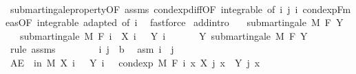 \begin{isabellebody}
%
\isadelimproof
\ \ %
\endisadelimproof
%
\isatagproof
{}\isamarkupfalse%
\ submartingale{\isacharunderscore}{\kern0pt}property{\isacharbrackleft}{\kern0pt}OF\ assms{\isacharbrackright}{\kern0pt}\ cond{\isacharunderscore}{\kern0pt}exp{\isacharunderscore}{\kern0pt}diff{\isacharbrackleft}{\kern0pt}OF\ integrable{\isacharparenleft}{\kern0pt}{}{\isacharcomma}{\kern0pt}{}{\isacharparenright}{\kern0pt}{\isacharcomma}{\kern0pt}\ of\ i\ j\ i{\isacharbrackright}{\kern0pt}\ cond{\isacharunderscore}{\kern0pt}exp{\isacharunderscore}{\kern0pt}F{\isacharunderscore}{\kern0pt}meas{\isacharbrackleft}{\kern0pt}OF\ integrable\ adapted{\isacharcomma}{\kern0pt}\ of\ i{\isacharbrackright}{\kern0pt}\ \isamarkupfalse%
\ fastforce%
\endisatagproof
{\isafoldproof}%
%
\isadelimproof
\isanewline
%
\endisadelimproof
\isanewline
{}\isamarkupfalse%
\ add{\isacharbrackleft}{\kern0pt}intro{\isacharbrackright}{\kern0pt}{\isacharcolon}{\kern0pt}\isanewline
\ \ \ {\isachardoublequoteopen}submartingale\ M\ F\ Y{\isachardoublequoteclose}\isanewline
\ \ \ {\isachardoublequoteopen}submartingale\ M\ F\ {\isacharparenleft}{\kern0pt}{\isasymlambda}i\ {\isasymxi}{\isachardot}{\kern0pt}\ X\ i\ {\isasymxi}\ {\isacharplus}{\kern0pt}\ Y\ i\ {\isasymxi}{\isacharparenright}{\kern0pt}{\isachardoublequoteclose}\isanewline
%
\isadelimproof
%
\endisadelimproof
%
\isatagproof
{}\isamarkupfalse%
\ {\isacharminus}{\kern0pt}\isanewline
\ \ \isamarkupfalse%
\ Y{\isacharcolon}{\kern0pt}\ submartingale\ M\ F\ Y\ \isamarkupfalse%
\ {\isacharparenleft}{\kern0pt}rule\ assms{\isacharparenright}{\kern0pt}\isanewline
\ \ \isacommand{{\isacharbraceleft}{\kern0pt}}\isamarkupfalse%
\isanewline
\ \ \ \ \isamarkupfalse%
\ i\ j\ {\isacharcolon}{\kern0pt}{\isacharcolon}{\kern0pt}\ {\isacharprime}{\kern0pt}b\ \isamarkupfalse%
\ asm{\isacharcolon}{\kern0pt}\ {\isachardoublequoteopen}i\ {\isasymle}\ j{\isachardoublequoteclose}\isanewline
\ \ \ \ \isamarkupfalse%
\ {\isachardoublequoteopen}AE\ {\isasymxi}\ in\ M{\isachardot}{\kern0pt}\ X\ i\ {\isasymxi}\ {\isacharplus}{\kern0pt}\ Y\ i\ {\isasymxi}\ {\isasymle}\ cond{\isacharunderscore}{\kern0pt}exp\ M\ {\isacharparenleft}{\kern0pt}F\ i{\isacharparenright}{\kern0pt}\ {\isacharparenleft}{\kern0pt}{\isasymlambda}x{\isachardot}{\kern0pt}\ X\ j\ x\ {\isacharplus}{\kern0pt}\ Y\ j\ x{\isacharparenright}{\kern0pt}\ {\isasymxi}{\isachardoublequoteclose}\ \isanewline
\ \ \ \ \ \ \isamarkupfalse%

\end{isabellebody}
